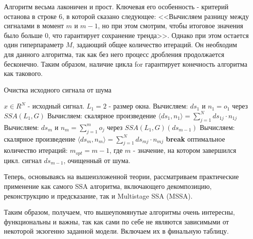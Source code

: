 Алгоритм весьма лаконичен и прост. Ключевая его особенность - критерий останова в строке 6, в которой сказано следующее: <<Вычисляем разницу между сигналами в момент $m$ и $m - 1$, но при этом смотрим, чтобы итоговое значения было больше $0$, что гарантирует сохранение тренда>>. Однако при этом остается один гиперпараметр $M$, задающий общее количество итераций. Он необходим для данного алгоритма, так как без него процесс дробления продолжается бесконечно. Таким образом, наличие цикла for гарантирует конечность алгоритма как такового.
\begin{algorithm}[H]
	\caption{Очистка исходного сигнала от шума} \label{alg::signal_denoising_ssa}
	\begin{algorithmic}[1]
		\Require $x \in R^N$ - исходный сигнал.
		\Require $L_1 = 2$ - размер окна.
		\State Вычисляем: $ds_1$ и $n_1 = o_1$ через $SSA(L_1, G)$
		\State Вычисляем: скалярное произведение $\langle ds_1, n_1 \rangle = \sum_{j = 1}^N ds_{1j} \cdot n_{1j}$
			\State Вычисляем: $ds_m$ и $n_m = \sum_{j = 1}^m o_j$ через $SSA(L_1, G)(ds_{m - 1})$
			\State Вычисляем: скалярное произведение $\langle ds_m, n_m \rangle = \sum_{j = 1}^N ds_{mj} \cdot n_{mj}$
				\State \textbf{break}
			\EndIf
		\EndFor
		\State \Return оптимальное количество итераций: $m_{opt} = m - 1$, где $m$ - значение, на котором завершился цикл.
		\State \Return сигнал $ds_{m - 1}$, очищенный от шума.
	\end{algorithmic}
\end{algorithm}
\noindent Теперь, основываясь на вышеизложенной теории, рассматриваем практические применение как самого SSA алгоритма, включающего декомпозицию, реконструкцию и предсказание, так и Multistage SSA (MSSA).





Таким образом, получаем, что вышеупомянутые алгоритмы очень интересны, функциональны и важны, так как сами по себе не являются зависимыми от некоторой экзогенно заданной модели. Включаем их в финальную таблицу.
